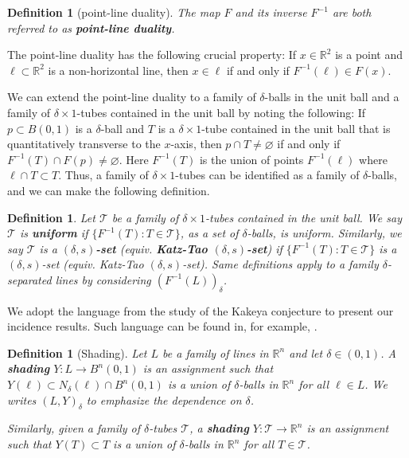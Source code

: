 \documentclass{amsart}
\numberwithin{equation}{section}
\newtheorem{definition}[theorem]{Definition}
\newcommand{\de}{\delta}
\newcommand{\ZR}{\mathbb{R}}
\newcommand{\cT}{{\mathcal T}}
\begin{document}
\begin{definition}[point-line duality]
\label{point-line-duality}
The map $F$ and its inverse $F^{-1}$ are both referred to as {\bf{point-line duality}}. 
\end{definition}

The point-line duality has the following crucial property: If $x\in\ZR^2$ is a point and $\ell\subset\ZR^2$ is a non-horizontal line, then $x\in \ell$ if and only if $F^{-1}(\ell)\in F(x)$. 

We can extend the point-line duality to a family of $\de$-balls in the unit ball and a family of $\de\times1$-tubes contained in the unit ball by noting the following: 
If $p\subset B(0,1)$ is a $\de$-ball and $T$ is a  $\de\times 1$-tube contained in the unit ball that is quantitatively transverse to the $x$-axis, then $p\cap T\not=\varnothing$ if and only if $F^{-1}(T)\cap F(p)\not=\varnothing$. 
Here $F^{-1}(T)$ is the union of points $F^{-1}(\ell)$ where $\ell\cap T\subset T$. 
Thus, a family of $\de\times1$-tubes can be identified as a family of $\de$-balls, and we can make the following definition.


\begin{definition}
Let $\cT$ be a family of $\de\times1$-tubes contained in the unit ball. We say $\cT$ is {\bf uniform} if $\{F^{-1}(T):T\in\cT\}$, as a set of $\de$-balls, is uniform. 
Similarly, we say $\cT$ is a  {\bf $(\de,s)$-set} (equiv. {\bf Katz-Tao $(\de,s)$-set}) if $\{F^{-1}(T):T\in\cT\}$ is a $(\de,s)$-set (equiv. Katz-Tao $(\de,s)$-set).
Same definitions apply to a family $\de$-separated lines by considering $(F^{-1}(L))_\de$.
\end{definition}


\medskip



We adopt the language from the study of the Kakeya conjecture to present our incidence results.
Such language can be found in, for example, \cite{KWZ}.


\begin{definition}[Shading]
\label{shading-def}
Let $L$ be a family of lines in $\ZR^n$ and let $\de\in(0,1)$.
A {\bf shading} $Y:L\to B^n(0,1)$ is an assignment such that $Y(\ell)\subset N_\de(\ell)\cap B^n(0,1)$ is a union of $\de$-balls in $\ZR^n$ for all $\ell\in L$.
We writes $(L,Y)_\de$ to emphasize the dependence on $\de$. 

Similarly, given a family of $\de$-tubes $\cT$, a {\bf shading} $Y:\cT\to\ZR^n$ is an assignment such that $Y(T)\subset T$ is a union of $\de$-balls in $\ZR^n$ for all $T\in \cT$.
\end{definition}
\end{document}
